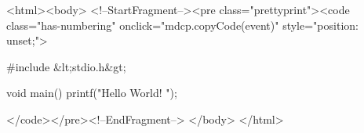 <html><body>
<!--StartFragment--><pre class="prettyprint"><code class="has-numbering" onclick="mdcp.copyCode(event)" style="position: unset;">\begin{verbbox}
#include &lt;stdio.h&gt;

void main()
{
    printf("Hello World! \n");
}
\end{verbbox}  

\begin{figure}[ht]
  \centering            %
  \theverbbox 
\end{figure}</code></pre><!--EndFragment-->
</body>
</html>